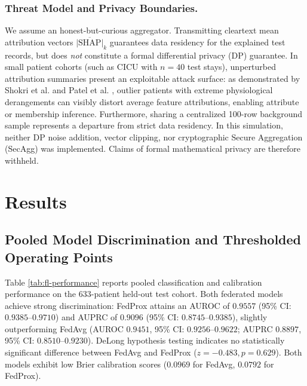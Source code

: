 \documentclass[runningheads]{llncs}
\begin{document}
\subsubsection{Threat Model and Privacy Boundaries.}
We assume an honest-but-curious aggregator. Transmitting cleartext mean attribution vectors $\overline{|\text{SHAP}|}_k$ guarantees data residency for the explained test records, but does \emph{not} constitute a formal differential privacy (DP) guarantee. In small patient cohorts (such as CICU with $n=40$ test stays), unperturbed attribution summaries present an exploitable attack surface: as demonstrated by Shokri et al. \cite{shokri2021privacy} and Patel et al. \cite{patel2022model}, outlier patients with extreme physiological derangements can visibly distort average feature attributions, enabling attribute or membership inference. Furthermore, sharing a centralized 100-row background sample represents a departure from strict data residency. In this simulation, neither DP noise addition, vector clipping, nor cryptographic Secure Aggregation (SecAgg) \cite{bonawitz2017practical} was implemented. Claims of formal mathematical privacy are therefore withheld.

\section{Results}\label{sec:results}

\subsection{Pooled Model Discrimination and Thresholded Operating Points}
Table \ref{tab:fl-performance} reports pooled classification and calibration performance on the 633-patient held-out test cohort. Both federated models achieve strong discrimination: FedProx attains an AUROC of $0.9557$ (95\% CI: $0.9385$--$0.9710$) and AUPRC of $0.9096$ (95\% CI: $0.8745$--$0.9385$), slightly outperforming FedAvg (AUROC $0.9451$, 95\% CI: $0.9256$--$0.9622$; AUPRC $0.8897$, 95\% CI: $0.8510$--$0.9230$). DeLong hypothesis testing indicates no statistically significant difference between FedAvg and FedProx ($z = -0.483, p = 0.629$). Both models exhibit low Brier calibration scores ($0.0969$ for FedAvg, $0.0792$ for FedProx).
\end{document}
